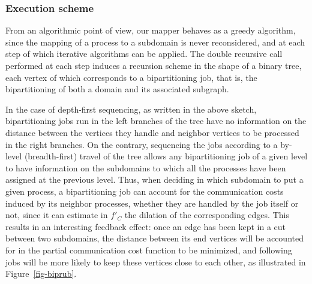 \subsubsection{Execution scheme}

From an algorithmic point of view, our mapper behaves as a greedy algorithm,
since the mapping of a process to a subdomain is never reconsidered, and
at each step of which iterative algorithms can be applied.
The double recursive call performed at each step induces a recursion scheme
in the shape of a binary tree, each vertex of which corresponds to a
bipartitioning job, that is, the bipartitioning of both a domain and
its associated subgraph.

In the case of depth-first sequencing, as written in the above sketch,
bipartitioning jobs run in the left branches of the tree have no information
on the distance between the vertices they handle and neighbor vertices to be
processed in the right branches.
On the contrary, sequencing the jobs according to a by-level (breadth-first)
travel of the tree allows any bipartitioning job of a given level to
have information on the subdomains to which all the processes have been
assigned at the previous level.
Thus, when deciding in which subdomain to put a given process, a
bipartitioning job can account for the communication costs induced by
its neighbor processes, whether they are handled by the job itself or not,
since it can estimate in $f'_C$ the dilation of the corresponding edges.
This results in an interesting feedback effect: once an edge has been kept
in a cut between two subdomains, the distance between its end vertices will
be accounted for in the partial communication cost function to be minimized,
and following jobs will be more likely to keep these vertices close to
each other, as illustrated in Figure~\ref{fig-biprub}.
